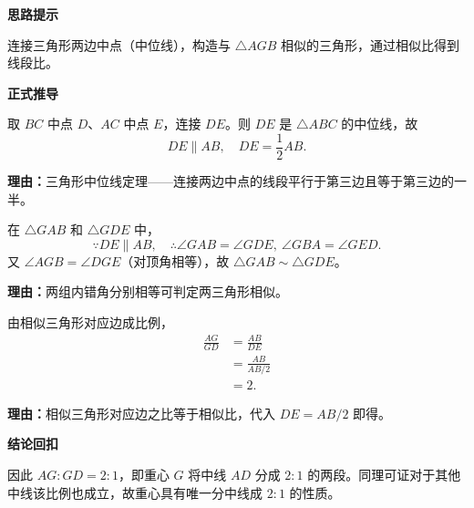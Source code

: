 \begin{proofbox}
	\textbf{\textcolor{CProof}{思路提示}}

	连接三角形两边中点（中位线），构造与 \(\triangle AGB\) 相似的三角形，通过相似比得到线段比。

	\medskip
	\textbf{\textcolor{CProof}{正式推导}}
	\begin{description}[style=nextline, leftmargin=2.8em, labelsep=0.5em, itemsep=0.55em]
		\item[\textbf{步骤一（构造中位线）：}] 取 \(BC\) 中点 \(D\)、\(AC\) 中点 \(E\)，连接 \(DE\)。则 \(DE\) 是 \(\triangle ABC\) 的中位线，故
		      \[
			      DE \parallel AB,\quad DE = \frac12 AB.
		      \]
		      \par\textbf{理由：}三角形中位线定理——连接两边中点的线段平行于第三边且等于第三边的一半。

		\item[\textbf{步骤二（证明相似三角形）：}] 在 \(\triangle GAB\) 和 \(\triangle GDE\) 中，
		      \[
			      \because DE \parallel AB,\quad \therefore \angle GAB = \angle GDE,\ \angle GBA = \angle GED.
		      \]
		      又 \(\angle AGB = \angle DGE\)（对顶角相等），故 \(\triangle GAB \sim \triangle GDE\)。
		      \par\textbf{理由：}两组内错角分别相等可判定两三角形相似。

		\item[\textbf{步骤三（建立比例关系）：}] 由相似三角形对应边成比例，
		      \[
			      \begin{aligned}
				      \frac{AG}{GD} & = \frac{AB}{DE}   \\
				                    & = \frac{AB}{AB/2} \\
				                    & = 2.
			      \end{aligned}
		      \]
		      \par\textbf{理由：}相似三角形对应边之比等于相似比，代入 \(DE = AB/2\) 即得。
	\end{description}

	\medskip
	\textbf{\textcolor{CProof}{结论回扣}}

	因此 \(AG : GD = 2 : 1\)，即重心 \(G\) 将中线 \(AD\) 分成 \(2:1\) 的两段。同理可证对于其他中线该比例也成立，故重心具有唯一分中线成 \(2:1\) 的性质。
\end{proofbox}
